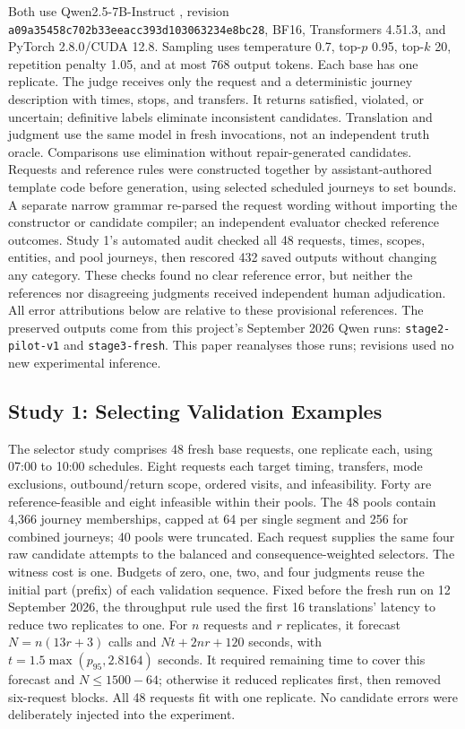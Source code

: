 \documentclass[a4paper,twoside]{article}
\begin{document}
Both use Qwen2.5-7B-Instruct \cite{qwen}, revision \texttt{a09a35458c702b33eeac\allowbreak{}c393d103063234e8bc28}, BF16, Transformers 4.51.3, and PyTorch 2.8.0/CUDA 12.8. Sampling uses temperature 0.7, top-$p$ 0.95, top-$k$ 20, repetition penalty 1.05, and at most 768 output tokens. Each base has one replicate.
The judge receives only the request and a deterministic journey description with times, stops, and transfers. It returns satisfied, violated, or uncertain; definitive labels eliminate inconsistent candidates. Translation and judgment use the same model in fresh invocations, not an independent truth oracle. Comparisons use elimination without repair-generated candidates.
Requests and reference rules were constructed together by assistant-authored template code before generation, using selected scheduled journeys to set bounds. A separate narrow grammar re-parsed the request wording without importing the constructor or candidate compiler; an independent evaluator checked reference outcomes. Study 1's automated audit checked all 48 requests, times, scopes, entities, and pool journeys, then rescored 432 saved outputs without changing any category. These checks found no clear reference error, but neither the references nor disagreeing judgments received independent human adjudication. All error attributions below are relative to these provisional references.
The preserved outputs come from this project's September 2026 Qwen runs: \texttt{stage2-pilot-v1} and \texttt{stage3-fresh}. This paper reanalyses those runs; revisions used no new experimental inference.

\subsection{Study 1: Selecting Validation Examples}

The selector study comprises 48 fresh base requests, one replicate each, using 07:00 to 10:00 schedules. Eight requests each target timing, transfers, mode exclusions, outbound/return scope, ordered visits, and infeasibility. Forty are reference-feasible and eight infeasible within their pools. The 48 pools contain 4,366 journey memberships, capped at 64 per single segment and 256 for combined journeys; 40 pools were truncated.
Each request supplies the same four raw candidate attempts to the balanced and consequence-weighted selectors. The witness cost is one. Budgets of zero, one, two, and four judgments reuse the initial part (prefix) of each validation sequence. Fixed before the fresh run on 12 September 2026, the throughput rule used the first 16 translations' latency to reduce two replicates to one. For $n$ requests and $r$ replicates, it forecast $N=n(13r+3)$ calls and $Nt+2nr+120$ seconds, with $t=1.5\max(p_{95},2.8164)$ seconds. It required remaining time to cover this forecast and $N\leq1500-64$; otherwise it reduced replicates first, then removed six-request blocks. All 48 requests fit with one replicate. No candidate errors were deliberately injected into the experiment.
\end{document}
